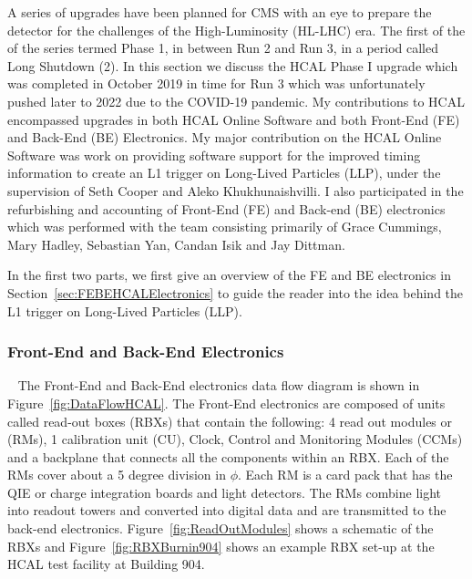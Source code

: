 A series of upgrades have been planned for CMS with an eye to prepare the detector for the challenges of the High-Luminosity (HL-LHC) era. The first of the of the series termed Phase 1, in between Run 2 and Run 3, in a period called Long Shutdown (2). In this section we discuss the HCAL Phase I upgrade which was completed in October 2019 in time for Run 3 which was unfortunately pushed later to 2022 due to the COVID-19 pandemic. My contributions to HCAL encompassed upgrades in both HCAL Online Software and both Front-End (FE) and Back-End (BE) Electronics. My major contribution on the HCAL Online Software was work on providing software support for the improved timing information to create an L1 trigger on Long-Lived Particles (LLP), under the supervision of Seth Cooper and Aleko Khukhunaishvilli. I also participated in the refurbishing and accounting of Front-End (FE) and Back-end (BE) electronics which was performed with the team consisting primarily of Grace Cummings, Mary Hadley, Sebastian Yan, Candan Isik and Jay Dittman.

In the first two parts, we first give an overview of the FE and BE electronics in Section~\ref{sec:FEBEHCALElectronics} to guide the reader into the idea behind the L1 trigger on Long-Lived Particles (LLP).

\subsubsection{Front-End and Back-End Electronics}~\label{sec:FEBEHCALElectronics}
The Front-End and Back-End electronics data flow diagram is shown in Figure~\ref{fig:DataFlowHCAL}. The Front-End electronics are composed of units called read-out boxes (RBXs) that contain the following: 4 read out modules or (RMs), 1 calibration unit (CU), Clock, Control and Monitoring Modules (CCMs) and a backplane that connects all the components within an RBX. Each of the RMs cover about a 5 degree division in $\phi$. Each RM is a card pack that has the QIE or charge integration boards and light detectors. The RMs combine light into readout towers and converted into digital data and are transmitted to the back-end electronics. Figure~\ref{fig:ReadOutModules} shows a schematic of the RBXs and Figure~\ref{fig:RBXBurnin904} shows an example RBX set-up at the HCAL test facility at Building 904.


